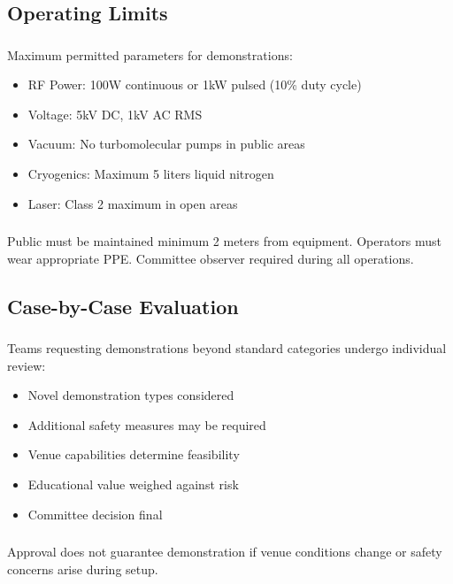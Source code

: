 \subsection{Operating Limits}

\subsubsection{}
Maximum permitted parameters for demonstrations:
\begin{itemize}[noitemsep]
    \item RF Power: 100W continuous or 1kW pulsed (10\% duty cycle)
    \item Voltage: 5kV DC, 1kV AC RMS
    \item Vacuum: No turbomolecular pumps in public areas
    \item Cryogenics: Maximum 5 liters liquid nitrogen
    \item Laser: Class 2 maximum in open areas
\end{itemize}

\subsubsection{}
Public must be maintained minimum 2 meters from equipment. Operators must wear appropriate PPE. Committee observer required during all operations.

\subsection{Case-by-Case Evaluation}

\subsubsection{}
Teams requesting demonstrations beyond standard categories undergo individual review:
\begin{itemize}[noitemsep]
    \item Novel demonstration types considered
    \item Additional safety measures may be required
    \item Venue capabilities determine feasibility
    \item Educational value weighed against risk
    \item Committee decision final
\end{itemize}

\subsubsection{}
Approval does not guarantee demonstration if venue conditions change or safety concerns arise during setup.

